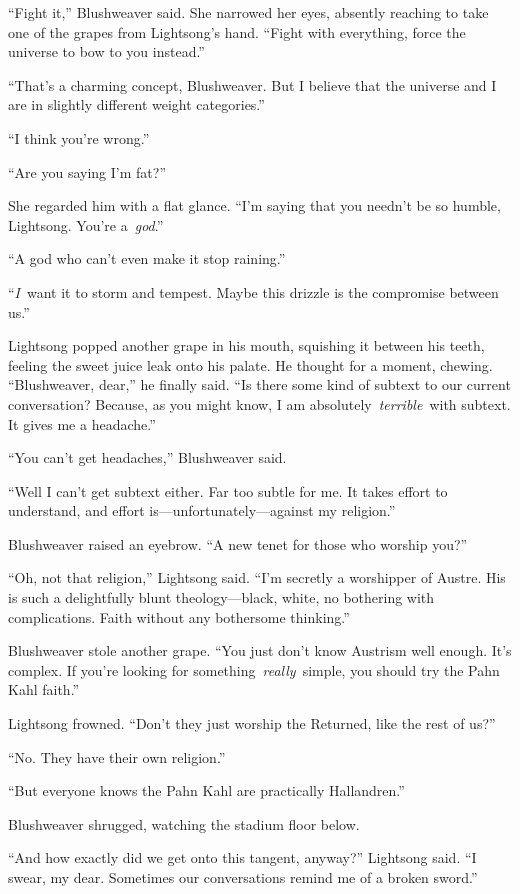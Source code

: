“Fight it,” Blushweaver said. She narrowed her eyes, absently reaching to take one of the grapes from Lightsong’s hand. “Fight with everything, force the universe to bow to you instead.”

“That’s a charming concept, Blushweaver. But I believe that the universe and I are in slightly different weight categories.”

“I think you’re wrong.”

“Are you saying I’m fat?”

She regarded him with a flat glance. “I’m saying that you needn’t be so humble, Lightsong. You’re a~\textit{god}.”

“A god who can’t even make it stop raining.”

“\textit{I}~want it to storm and tempest. Maybe this drizzle is the compromise between us.”

Lightsong popped another grape in his mouth, squishing it between his teeth, feeling the sweet juice leak onto his palate. He thought for a moment, chewing. “Blushweaver, dear,” he finally said. “Is there some kind of subtext to our current conversation? Because, as you might know, I am absolutely~\textit{terrible}~with subtext. It gives me a headache.”

“You can’t get headaches,” Blushweaver said.

“Well I can’t get subtext either. Far too subtle for me. It takes effort to understand, and effort is—unfortunately—against my religion.”

Blushweaver raised an eyebrow. “A new tenet for those who worship you?”

“Oh, not that religion,” Lightsong said. “I’m secretly a worshipper of Austre. His is such a delightfully blunt theology—black, white, no bothering with complications. Faith without any bothersome thinking.”

Blushweaver stole another grape. “You just don’t know Austrism well enough. It’s complex. If you’re looking for something~\textit{really}~simple, you should try the Pahn Kahl faith.”

Lightsong frowned. “Don’t they just worship the Returned, like the rest of us?”

“No. They have their own religion.”

“But everyone knows the Pahn Kahl are practically Hallandren.”

Blushweaver shrugged, watching the stadium floor below.

“And how exactly did we get onto this tangent, anyway?” Lightsong said. “I swear, my dear. Sometimes our conversations remind me of a broken sword.”

